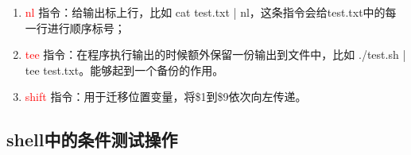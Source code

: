 \begin{enumerate}
\begin{lstlisting}
         commentstyle=\color{red!50!green!50!blue!50},frame=shadowbox,
         rulesepcolor=\color{red!20!green!20!blue!20},basicstyle=\ttfamily]
cat<<x
  please input your name:
      1) user1
      2) user2
      3) user3
x
    \end{lstlisting}
  \item \textcolor{red}{nl} 指令：给输出标上行，比如 cat test.txt | nl，这条指令会给test.txt中的每一行进行顺序标号；
  \item \textcolor{red}{tee} 指令：在程序执行输出的时候额外保留一份输出到文件中，比如 ./test.sh | tee test.txt。能够起到一个备份的作用。
  \item \textcolor{red}{shift} 指令：用于迁移位置变量，将\$1到\$9依次向左传递。
\end{enumerate}

\subsection{shell中的条件测试操作}
